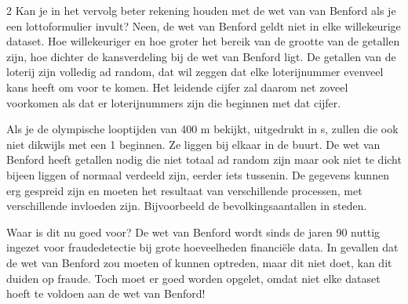 \begin{multicols}{2}
Kan je in het vervolg beter rekening houden met de wet van van Benford als je een lottoformulier invult? Neen, de wet van Benford geldt niet in elke willekeurige dataset. Hoe willekeuriger en hoe groter het bereik van de grootte van de getallen zijn, hoe dichter de kansverdeling bij de wet van Benford ligt. De getallen van de loterij zijn volledig ad random, dat wil zeggen dat elke loterijnummer evenveel kans heeft om voor te komen. Het leidende cijfer zal daarom net zoveel voorkomen als dat er loterijnummers zijn die beginnen met dat cijfer. 

Als je de olympische looptijden van 400 m bekijkt, uitgedrukt in s, zullen die ook niet dikwijls met een 1 beginnen. Ze liggen bij elkaar in de buurt.
De wet van Benford heeft getallen nodig die niet totaal ad random zijn maar ook niet te dicht bijeen liggen of normaal verdeeld zijn, eerder iets tussenin.
De gegevens kunnen erg gespreid zijn en moeten het resultaat van verschillende processen, met verschillende invloeden zijn. Bijvoorbeeld de bevolkingsaantallen in steden.

Waar is dit nu goed voor?
De wet van Benford wordt sinds de jaren 90 nuttig ingezet voor fraudedetectie bij grote hoeveelheden financiële data. In gevallen dat de wet van Benford zou moeten of kunnen optreden, maar dit niet doet, kan dit duiden op fraude. Toch moet er goed worden opgelet, omdat niet elke dataset hoeft te voldoen aan de wet van Benford! 
\end{multicols}


\stopcontents[mainsections]			        %


